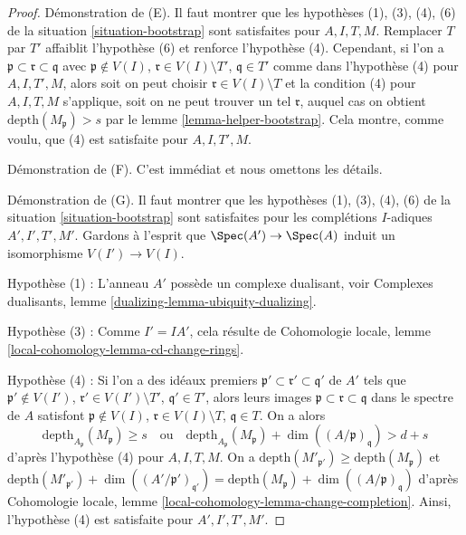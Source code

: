 \begin{proof}
Démonstration de (E). Il faut montrer que les hypothèses (1), (3), (4), (6)
de la situation \ref{situation-bootstrap} sont satisfaites pour
$A, I, T, M$. Remplacer $T$ par $T'$
affaiblit l'hypothèse (6) et renforce l'hypothèse (4). Cependant, si l'on a
$\mathfrak p \subset \mathfrak r \subset \mathfrak q$ avec
$\mathfrak p \not \in V(I)$, $\mathfrak r \in V(I) \setminus T'$,
$\mathfrak q \in T'$ comme dans l'hypothèse (4) pour $A, I, T', M$, alors
soit on peut choisir $\mathfrak r \in V(I) \setminus T$ et
la condition (4) pour $A, I, T, M$ s'applique, soit on ne peut
trouver un tel $\mathfrak r$, auquel cas on obtient
$\text{depth}(M_\mathfrak p) > s$ par le lemme \ref{lemma-helper-bootstrap}.
Cela montre, comme voulu, que (4) est satisfaite pour $A, I, T', M$.

\medskip\noindent
Démonstration de (F). C'est immédiat et nous omettons les détails.

\medskip\noindent
Démonstration de (G). Il faut montrer que les hypothèses (1), (3), (4), (6)
de la situation \ref{situation-bootstrap} sont satisfaites pour les complétions $I$-adiques
$A', I', T', M'$. Gardons à l'esprit que
$\Spec(A') \to \Spec(A)$ induit un isomorphisme $V(I') \to V(I)$.

\medskip\noindent
Hypothèse (1) : L'anneau $A'$ possède un complexe dualisant, voir
Complexes dualisants, lemme \ref{dualizing-lemma-ubiquity-dualizing}.

\medskip\noindent
Hypothèse (3) : Comme $I' = IA'$, cela résulte de Cohomologie locale,
lemme \ref{local-cohomology-lemma-cd-change-rings}.

\medskip\noindent
Hypothèse (4) : Si l'on a des idéaux premiers
$\mathfrak p' \subset \mathfrak r' \subset \mathfrak q'$ de $A'$
tels que $\mathfrak p' \not \in V(I')$,
$\mathfrak r' \in V(I') \setminus T'$,
$\mathfrak q' \in T'$, alors leurs images
$\mathfrak p \subset \mathfrak r \subset \mathfrak q$ dans
le spectre de $A$
satisfont
$\mathfrak p \not \in V(I)$, $\mathfrak r \in V(I) \setminus T$,
$\mathfrak q \in T$.
On a alors
$$
\text{depth}_{A_\mathfrak p}(M_\mathfrak p) \geq s
\quad\text{ou}\quad
\text{depth}_{A_\mathfrak p}(M_\mathfrak p) +
\dim((A/\mathfrak p)_\mathfrak q) > d + s
$$
d'après l'hypothèse (4) pour $A, I, T, M$. On a
$\text{depth}(M'_{\mathfrak p'}) \geq \text{depth}(M_\mathfrak p)$ et
$\text{depth}(M'_{\mathfrak p'}) +
\dim((A'/\mathfrak p')_{\mathfrak q'}) =
\text{depth}(M_\mathfrak p) +
\dim((A/\mathfrak p)_\mathfrak q)$
d'après Cohomologie locale, lemme \ref{local-cohomology-lemma-change-completion}.
Ainsi, l'hypothèse (4) est satisfaite pour $A', I', T', M'$.


\end{proof}
